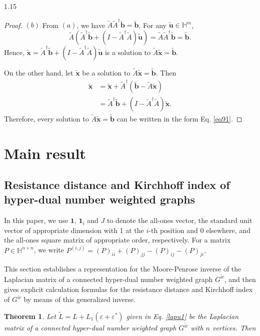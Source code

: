 \documentclass[preprint,12pt]{elsarticle1}
\newtheorem{thm}{Theorem}[section]
\numberwithin{equation}{section}
\begin{document}
\begin{spacing}{1.15}
\begin{proof}
 $(b)$  From $(a)$, we have $\widetilde{A}\widetilde{A}^{\dag}
 \widetilde{\mathbf{b}}=\widetilde{\mathbf{b}}$. For any $\widetilde{\mathbf{u}}\in \mathbb{H}^{m}$,   $$
\widetilde{A}(\widetilde{A}^{\dag}
\widetilde{\mathbf{b}}+
(I-\widetilde{A}^{\dag}\widetilde{A})
\widetilde{\mathbf{u}})
=\widetilde{A}\widetilde{A}^{\dag}\widetilde{\mathbf{b}}
=\widetilde{\mathbf{b}}.$$ Hence, $\widetilde{\mathbf{x}}=\widetilde{A}^{\dag}\widetilde{\mathbf{b}}
+(I-\widetilde{A}^{\dag}\widetilde{A})
\widetilde{\mathbf{u}}$ is a solution to $\widetilde{A}
\widetilde{\mathbf{x}}=\widetilde{\mathbf{b}}$.

On the other hand, let
$\widetilde{\mathbf{x}}$ be a solution to $\widetilde{A}
\widetilde{\mathbf{x}}=\widetilde{\mathbf{b}}$.
 Then
\begin{align}\nonumber \widetilde{\mathbf{x}}&=\widetilde{\mathbf{x}}
+\widetilde{A}^{\dag}(\widetilde{\mathbf{b}}-
\widetilde{A}\widetilde{\mathbf{x}})\\ \nonumber
&=\widetilde{A}^{\dag}\widetilde{\mathbf{b}}+
(I-\widetilde{A}^{\dag}\widetilde{A})\widetilde{\mathbf{x}}.
\end{align}
Therefore, every solution to $\widetilde{A}\widetilde{\mathbf{x}}
=\widetilde{\mathbf{b}}$ can be written in the form Eq. \eqref{eq91}.
\end{proof}

\section{Main result}
\subsection{Resistance distance  and  Kirchhoff index of hyper-dual number  weighted graphs}
In this paper, we use $\textbf{1}$,
$\textbf{1}_{i}$ and $J$ to denote
the all-ones vector, the standard unit vector  of appropriate dimension with  1 at the $i$-th position and 0 elsewhere, and the all-ones square matrix of appropriate order, respectively.
For a matrix $P\in \mathbb{H}^{n\times n}$, we write $P^{(i,j)}=(P)_{ii}+(P)_{jj}-(P)_{ij}-(P)_{ji}.$

This section establishes a representation  for the Moore-Penrose inverse of the Laplacian matrix of a connected hyper-dual number weighted graph $G^{\widetilde{w}}$, and then  gives explicit  calculation formulas
 for the resistance distance and Kirchhoff index of $G^{\widetilde{w}}$ by means of this generalized inverse.
\begin{thm}\label{5.1}Let $\widetilde{L}=
L+L_{1}(\varepsilon+\varepsilon^{*})$ given in Eq. \eqref{lapu1} be the Laplacian matrix of a connected hyper-dual number weighted graph $G^{\widetilde{w}}$  with
$n$ vertices. Then


\end{thm}
\end{spacing}
\end{document}
